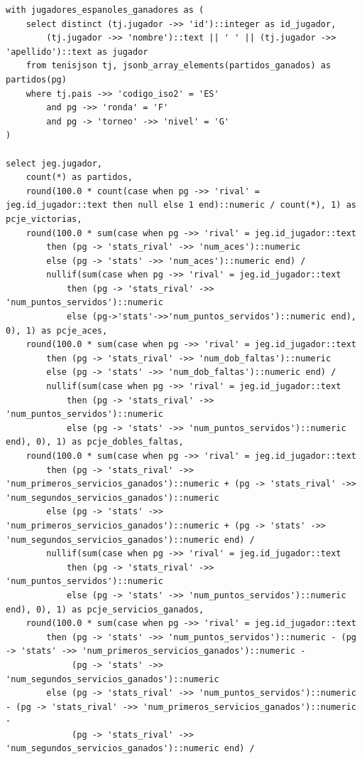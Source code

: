 \documentclass[11pt]{opticajnl}
\begin{document}
\begin{verbatim}
with jugadores_espanoles_ganadores as (
    select distinct (tj.jugador ->> 'id')::integer as id_jugador, 
    	(tj.jugador ->> 'nombre')::text || ' ' || (tj.jugador ->> 'apellido')::text as jugador
    from tenisjson tj, jsonb_array_elements(partidos_ganados) as partidos(pg)
    where tj.pais ->> 'codigo_iso2' = 'ES'
        and pg ->> 'ronda' = 'F'
        and pg -> 'torneo' ->> 'nivel' = 'G'
)

select jeg.jugador,
    count(*) as partidos,
    round(100.0 * count(case when pg ->> 'rival' = jeg.id_jugador::text then null else 1 end)::numeric / count(*), 1) as pcje_victorias,
    round(100.0 * sum(case when pg ->> 'rival' = jeg.id_jugador::text 
    	then (pg -> 'stats_rival' ->> 'num_aces')::numeric 
    	else (pg -> 'stats' ->> 'num_aces')::numeric end) / 
    	nullif(sum(case when pg ->> 'rival' = jeg.id_jugador::text 
    		then (pg -> 'stats_rival' ->> 'num_puntos_servidos')::numeric 
    		else (pg->'stats'->>'num_puntos_servidos')::numeric end), 0), 1) as pcje_aces,
    round(100.0 * sum(case when pg ->> 'rival' = jeg.id_jugador::text 
    	then (pg -> 'stats_rival' ->> 'num_dob_faltas')::numeric 
    	else (pg -> 'stats' ->> 'num_dob_faltas')::numeric end) / 
    	nullif(sum(case when pg ->> 'rival' = jeg.id_jugador::text 
    		then (pg -> 'stats_rival' ->> 'num_puntos_servidos')::numeric 
    		else (pg -> 'stats' ->> 'num_puntos_servidos')::numeric end), 0), 1) as pcje_dobles_faltas,
    round(100.0 * sum(case when pg ->> 'rival' = jeg.id_jugador::text 
    	then (pg -> 'stats_rival' ->> 'num_primeros_servicios_ganados')::numeric + (pg -> 'stats_rival' ->> 'num_segundos_servicios_ganados')::numeric 
    	else (pg -> 'stats' ->> 'num_primeros_servicios_ganados')::numeric + (pg -> 'stats' ->> 'num_segundos_servicios_ganados')::numeric end) / 
    	nullif(sum(case when pg ->> 'rival' = jeg.id_jugador::text 
    		then (pg -> 'stats_rival' ->> 'num_puntos_servidos')::numeric 
    		else (pg -> 'stats' ->> 'num_puntos_servidos')::numeric end), 0), 1) as pcje_servicios_ganados,
    round(100.0 * sum(case when pg ->> 'rival' = jeg.id_jugador::text 
    	then (pg -> 'stats' ->> 'num_puntos_servidos')::numeric - (pg -> 'stats' ->> 'num_primeros_servicios_ganados')::numeric - 
    		 (pg -> 'stats' ->> 'num_segundos_servicios_ganados')::numeric 
    	else (pg -> 'stats_rival' ->> 'num_puntos_servidos')::numeric - (pg -> 'stats_rival' ->> 'num_primeros_servicios_ganados')::numeric - 
    		 (pg -> 'stats_rival' ->> 'num_segundos_servicios_ganados')::numeric end) / 	

\end{verbatim}
\end{document}
